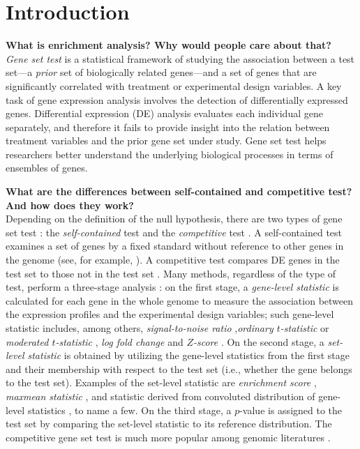 \documentclass[useAMS,usenatbib, galley]{biom}
\begin{document}
	\section{Introduction}\label{section:introduction}
	
	\textbf{What is enrichment analysis? Why would people care about that?}\\
	\textit{Gene set test} is a statistical framework of studying the association between a test set---a \textit{prior} set of biologically related genes---and a set of genes that are significantly correlated with treatment or experimental design variables. A key task of gene expression analysis involves the detection of differentially expressed genes. Differential expression (DE) analysis  evaluates each individual gene separately, and therefore it fails to provide insight into the relation between treatment variables and the prior gene set under study. Gene set test helps researchers better understand the underlying biological processes in terms of ensembles of genes.
	
	\textbf{What are the differences between self-contained and competitive test? And how does they work?}\\
	Depending on the definition of the null hypothesis, there are two types of gene set test \citep{goeman2007analyzing}: the \textit{self-contained} test and the \textit{competitive} test . A self-contained test examines a set of genes by a fixed standard without reference to other genes in the genome (see, for example, \cite{goeman2004global,goeman2005testing, tsai2009multivariate, wu2010roast, huang2013gene}). A competitive test compares DE
	genes in the test set to those not in the test set \citep{tian2005discovering, wu2012camera, yaari2013quantitative}. Many methods, regardless of the type of test, perform a three-stage analysis \citep{khatri2012ten}: on the first stage, a \textit{gene-level statistic} is calculated for each gene in the whole genome to measure the association between the expression profiles and the experimental design variables; such gene-level statistic includes, among others, \textit{signal-to-noise ratio} \citep{subramanian2005gene},\textit{ordinary $t$-statistic} \citep{tian2005discovering} or \textit{moderated $t$-statistic} \citep{Smyth2004moderated}, \textit{log fold change} \citep{kim2005page} and \textit{$Z$-score} \citep{efron2007correlation}. On the second stage, a \textit{set-level statistic} is obtained by utilizing the gene-level statistics from the first stage and their membership with respect to the test set (i.e., whether the gene belongs to the test set). Examples of the set-level statistic are \textit{enrichment score} \citep{subramanian2005gene}, \textit{maxmean statistic} \citep{efron2007testing}, and statistic derived from convoluted distribution of gene-level statistics \citep{yaari2013quantitative}, to name a few. On the third stage, a $p$-value is assigned to the test set by comparing the set-level statistic to its reference distribution. The competitive gene set test is much more popular among genomic literatures \citep{goeman2007analyzing, gatti2010heading}.  
	
\end{document}
